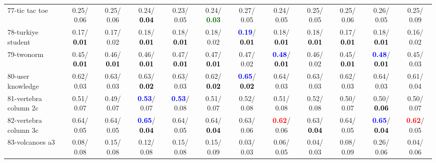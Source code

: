 \begin{table}[h]
\begin{center}
{\begin{tabular}{lc|c|c|c|c|c|c|c|c|c|c}
77-tic tac toe &   0.25/  0.06 &   0.25/  0.06 &   0.24/\textcolor{black}{\textbf{  0.04}} &   0.23/  0.05 &   0.24/\textcolor{darkgreen}{\textbf{  0.03}} &   0.27/  0.05 &   0.24/  0.05 &   0.25/  0.05 &   0.25/  0.06 &   0.26/  0.05 &   0.25/  0.09 \\
78-turkiye student &   0.17/\textcolor{black}{\textbf{  0.01}} &   0.17/  0.02 &   0.18/\textcolor{black}{\textbf{  0.01}} &   0.18/\textcolor{black}{\textbf{  0.01}} &   0.18/  0.02 & \textcolor{blue}{\textbf{  0.19}}/\textcolor{black}{\textbf{  0.01}} &   0.18/\textcolor{black}{\textbf{  0.01}} &   0.18/\textcolor{black}{\textbf{  0.01}} &   0.17/\textcolor{black}{\textbf{  0.01}} &   0.18/\textcolor{black}{\textbf{  0.01}} &   0.16/  0.02 \\ \hline
79-twonorm &   0.45/\textcolor{black}{\textbf{  0.01}} &   0.46/\textcolor{black}{\textbf{  0.01}} &   0.46/\textcolor{black}{\textbf{  0.01}} &   0.47/\textcolor{black}{\textbf{  0.01}} &   0.47/\textcolor{black}{\textbf{  0.01}} &   0.47/  0.02 & \textcolor{blue}{\textbf{  0.48}}/\textcolor{black}{\textbf{  0.01}} &   0.46/  0.02 &   0.45/\textcolor{black}{\textbf{  0.01}} & \textcolor{blue}{\textbf{  0.48}}/\textcolor{black}{\textbf{  0.01}} &   0.45/  0.03 \\
80-user knowledge &   0.62/  0.03 &   0.63/  0.03 &   0.63/\textcolor{black}{\textbf{  0.02}} &   0.63/  0.03 &   0.62/\textcolor{black}{\textbf{  0.02}} & \textcolor{blue}{\textbf{  0.65}}/\textcolor{black}{\textbf{  0.02}} &   0.64/  0.03 &   0.63/  0.03 &   0.62/  0.03 &   0.64/  0.03 &   0.61/  0.04 \\
81-vertebra column 2c &   0.51/  0.07 &   0.49/  0.07 & \textcolor{blue}{\textbf{  0.53}}/  0.07 & \textcolor{blue}{\textbf{  0.53}}/  0.08 &   0.51/  0.07 &   0.52/  0.08 &   0.51/  0.08 &   0.52/  0.08 &   0.50/  0.07 &   0.50/\textcolor{black}{\textbf{  0.06}} &   0.50/  0.07 \\
82-vertebra column 3c &   0.64/  0.05 &   0.64/  0.05 & \textcolor{blue}{\textbf{  0.65}}/\textcolor{black}{\textbf{  0.04}} &   0.64/  0.05 &   0.64/\textcolor{black}{\textbf{  0.04}} &   0.63/  0.06 & \textcolor{red}{\textbf{  0.62}}/  0.06 &   0.63/\textcolor{black}{\textbf{  0.04}} &   0.64/  0.05 & \textcolor{blue}{\textbf{  0.65}}/\textcolor{black}{\textbf{  0.04}} & \textcolor{red}{\textbf{  0.62}}/  0.05 \\
83-volcanoes a3 &   0.08/  0.08 &   0.15/  0.08 &   0.12/  0.08 &   0.15/  0.08 &   0.15/  0.09 &   0.03/  0.03 &   0.06/  0.05 &   0.04/  0.03 &   0.08/  0.09 &   0.26/  0.06 &   0.04/  0.06 \\

\end{tabular}}
\end{center}
\end{table}
